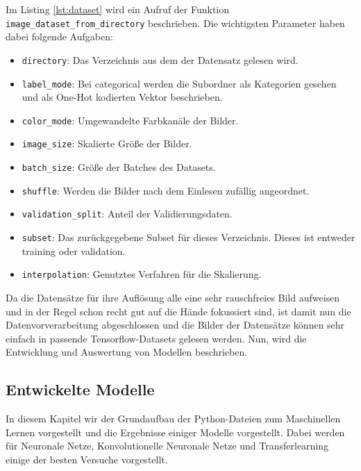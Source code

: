\documentclass[11pt,bibliography=totocnumbered]{scrartcl}
\begin{document}
Im Listing \ref{lst:dataset} wird ein Aufruf der Funktion \lstinline[language=pythoninline]|image_dataset_from_directory| beschrieben. Die wichtigsten Parameter haben dabei folgende Aufgaben:
\begin{itemize}
	\item \lstinline[language=pythoninline]|directory|: Das Verzeichnis aus dem der Datensatz gelesen wird.
	\item \lstinline[language=pythoninline]|label_mode|: Bei categorical werden die Subordner als Kategorien gesehen und als One-Hot kodierten Vektor beschrieben.
	\item \lstinline[language=pythoninline]|color_mode|: Umgewandelte Farbkanäle der Bilder.
	\item \lstinline[language=pythoninline]|image_size|: Skalierte Größe der Bilder.
	\item \lstinline[language=pythoninline]|batch_size|: Größe der Batches des Datasets.
	\item \lstinline[language=pythoninline]|shuffle|: Werden die Bilder nach dem Einlesen zufällig angeordnet.
	\item \lstinline[language=pythoninline]|validation_split|: Anteil der Validierungsdaten.
	\item \lstinline[language=pythoninline]|subset|: Das zurückgegebene Subset für dieses Verzeichnis. Dieses ist entweder training oder validation.
	\item \lstinline[language=pythoninline]|interpolation|: Genutztes Verfahren für die Skalierung.
\end{itemize}
Da die Datensätze für ihre Auflösung alle eine sehr rauschfreies Bild aufweisen und in der Regel schon recht gut auf die Hände fokussiert sind, ist damit nun die Datenvorverarbeitung abgeschlossen und die Bilder der Datensätze können sehr einfach in passende Tensorflow-Datasets gelesen werden. Nun, wird die Entwicklung und Auswertung von Modellen beschrieben.
\subsection{Entwickelte Modelle}
In diesem Kapitel wir der Grundaufbau der Python-Dateien zum Maschinellen Lernen vorgestellt und die Ergebnisse einiger Modelle vorgestellt. Dabei werden für Neuronale Netze, Konvolutionelle Neuronale Netze und Transferlearning einige der besten Versuche vorgestellt. 
\end{document}
